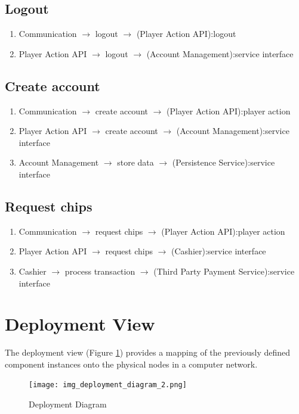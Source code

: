 \documentclass[a4paper,11pt]{report}
\begin{document}
\subsection{Logout}
\begin{enumerate}
\item Communication $\rightarrow$ logout $\rightarrow$ (Player Action API):logout
\item Player Action API $\rightarrow$ logout $\rightarrow$ (Account Management):service interface
\end{enumerate}

\subsection{Create account}
\begin{enumerate}
\item Communication $\rightarrow$ create account $\rightarrow$ (Player Action API):player action
\item Player Action API $\rightarrow$ create account $\rightarrow$ (Account Management):service interface
\item Account Management $\rightarrow$ store data $\rightarrow$ (Persistence Service):service interface
\end{enumerate}

\subsection{Request chips}
\begin{enumerate}
\item Communication $\rightarrow$ request chips $\rightarrow$ (Player Action API):player action
\item Player Action API $\rightarrow$ request chips $\rightarrow$ (Cashier):service interface
\item Cashier $\rightarrow$ process transaction $\rightarrow$ (Third Party Payment Service):service interface
\end{enumerate}

\section{Deployment View}
The deployment view (Figure \ref{fig:deployment}) provides a mapping of the previously defined component instances onto the physical nodes in a computer network. 
\begin{figure}
  \begin{center}
    \texttt{[image: img\_deployment\_diagram\_2.png]}
  \end{center}
  \caption{Deployment Diagram}\label{fig:deployment}
\end{figure}
\end{document}
